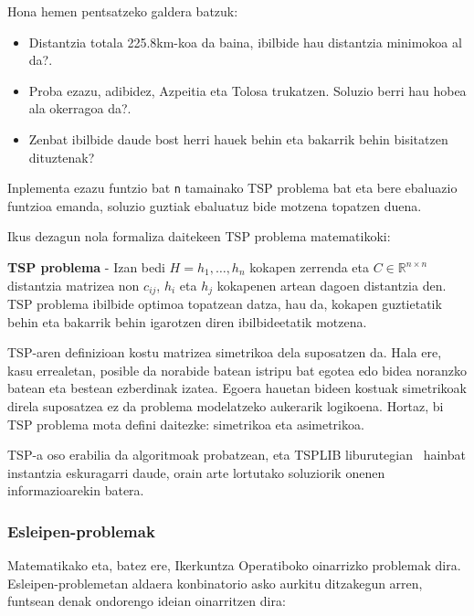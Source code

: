 \documentclass[eu]{ifirak}\usepackage[]{graphicx}\usepackage[]{color}
\newcommand{\code}[1]{\texttt{#1}}
\begin{document}
Hona hemen pentsatzeko galdera batzuk:
\begin{itemize}
  \item Distantzia totala 225.8km-koa da baina, ibilbide hau distantzia minimokoa al da?.  
  \item Proba ezazu, adibidez, Azpeitia eta Tolosa trukatzen. Soluzio berri hau hobea ala okerragoa da?. 
  \item Zenbat ibilbide daude bost herri hauek behin eta bakarrik behin bisitatzen dituztenak?
\end{itemize}

\begin{ifproblem}
Inplementa ezazu funtzio bat \code{n} tamainako TSP problema bat eta bere ebaluazio funtzioa emanda, soluzio guztiak ebaluatuz bide motzena topatzen duena.
\end{ifproblem}

Ikus dezagun nola formaliza daitekeen TSP problema matematikoki:

\begin{ifdefinition}{\bf TSP problema} -
Izan bedi $H={h_1, \ldots, h_n}$ kokapen zerrenda eta $C\in\mathbb{R}^{n\times n}$ distantzia matrizea non $c_{ij}$, $h_i$ eta $h_j$ kokapenen artean dagoen distantzia den. TSP problema ibilbide optimoa topatzean datza, hau da, kokapen guztietatik behin eta bakarrik behin igarotzen diren ibilbideetatik motzena.
\end{ifdefinition}

TSP-aren definizioan kostu matrizea simetrikoa dela suposatzen da. Hala ere, kasu errealetan, posible da norabide batean istripu bat egotea edo bidea noranzko batean eta bestean ezberdinak izatea. Egoera hauetan bideen kostuak simetrikoak direla suposatzea ez da problema modelatzeko aukerarik logikoena. Hortaz, bi TSP problema mota defini daitezke: simetrikoa eta asimetrikoa. 

TSP-a oso erabilia da algoritmoak probatzean, eta TSPLIB liburutegian~\cite{reinelt1990} hainbat instantzia eskuragarri daude, orain arte lortutako soluziorik onenen informazioarekin batera.

\subsubsection{Esleipen-problemak}

Matematikako eta, batez ere, Ikerkuntza Operatiboko oinarrizko problemak dira. Esleipen-problemetan aldaera konbinatorio asko aurkitu ditzakegun arren, funtsean denak ondorengo ideian oinarritzen dira:
\end{document}
